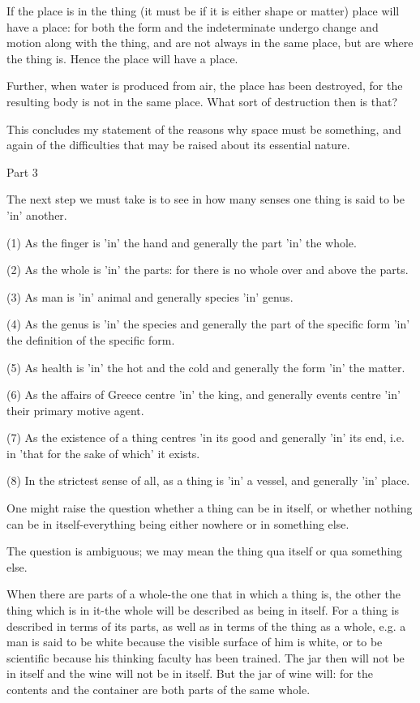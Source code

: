 If the place is in the thing (it must be if it is either shape or
matter) place will have a place: for both the form and the indeterminate
undergo change and motion along with the thing, and are not always
in the same place, but are where the thing is. Hence the place will
have a place. 

Further, when water is produced from air, the place has been destroyed,
for the resulting body is not in the same place. What sort of destruction
then is that? 

This concludes my statement of the reasons why space must be something,
and again of the difficulties that may be raised about its essential
nature. 

Part 3

The next step we must take is to see in how many senses one thing
is said to be 'in' another. 

(1) As the finger is 'in' the hand and generally the part 'in' the
whole. 

(2) As the whole is 'in' the parts: for there is no whole over and
above the parts. 

(3) As man is 'in' animal and generally species 'in' genus.

(4) As the genus is 'in' the species and generally the part of the
specific form 'in' the definition of the specific form. 

(5) As health is 'in' the hot and the cold and generally the form
'in' the matter. 

(6) As the affairs of Greece centre 'in' the king, and generally events
centre 'in' their primary motive agent. 

(7) As the existence of a thing centres 'in its good and generally
'in' its end, i.e. in 'that for the sake of which' it exists.

(8) In the strictest sense of all, as a thing is 'in' a vessel, and
generally 'in' place. 

One might raise the question whether a thing can be in itself, or
whether nothing can be in itself-everything being either nowhere or
in something else. 

The question is ambiguous; we may mean the thing qua itself or qua
something else. 

When there are parts of a whole-the one that in which a thing is,
the other the thing which is in it-the whole will be described as
being in itself. For a thing is described in terms of its parts, as
well as in terms of the thing as a whole, e.g. a man is said to be
white because the visible surface of him is white, or to be scientific
because his thinking faculty has been trained. The jar then will not
be in itself and the wine will not be in itself. But the jar of wine
will: for the contents and the container are both parts of the same
whole. 

